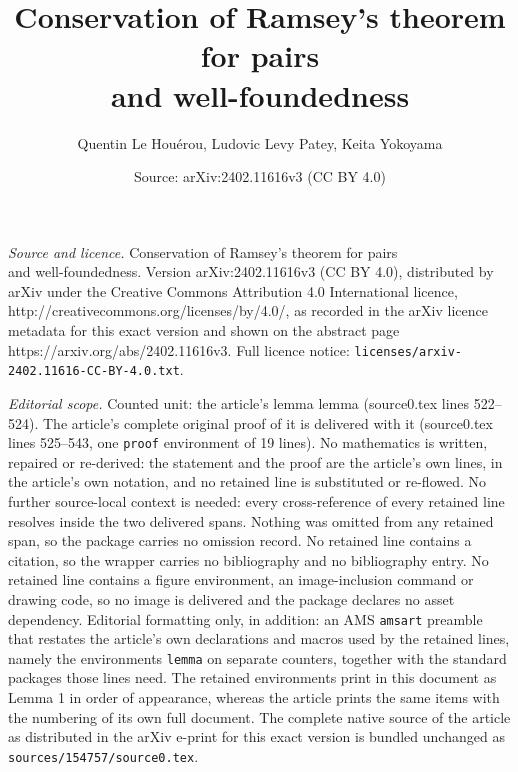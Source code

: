 \documentclass[10pt,a4paper]{amsart}
\title{Conservation of Ramsey's theorem for pairs\\ and well-foundedness}
\author{Quentin Le Hou\'erou, Ludovic Levy Patey, Keita Yokoyama}
\date{Source: arXiv:2402.11616v3 (CC BY 4.0)}
\newtheorem{lemma}{Lemma}
\begin{document}
\maketitle

\noindent\emph{Source and licence.} Conservation of Ramsey's theorem for pairs\\ and well-foundedness. Version arXiv:2402.11616v3 (CC BY 4.0), distributed by arXiv under the Creative Commons Attribution 4.0 International licence, http://creativecommons.org/licenses/by/4.0/, as recorded in the arXiv licence metadata for this exact version and shown on the abstract page https://arxiv.org/abs/2402.11616v3. Full licence notice: \texttt{licenses/arxiv-2402.11616-CC-BY-4.0.txt}.\par\smallskip

\noindent\textit{Editorial scope.} Counted unit: the article's lemma lemma (source0.tex lines 522--524). The article's complete original proof of it is delivered with it (source0.tex lines 525--543, one \texttt{proof} environment of 19 lines). No mathematics is written, repaired or re-derived: the statement and the proof are the article's own lines, in the article's own notation, and no retained line is substituted or re-flowed.  No further source-local context is needed: every cross-reference of every retained line resolves inside the two delivered spans.  Nothing was omitted from any retained span, so the package carries no omission record.  No retained line contains a citation, so the wrapper carries no bibliography and no bibliography entry.  No retained line contains a figure environment, an image-inclusion command or drawing code, so no image is delivered and the package declares no asset dependency.  Editorial formatting only, in addition: an AMS \texttt{amsart} preamble that restates the article's own declarations and macros used by the retained lines, namely the environments \texttt{lemma} on separate counters, together with the standard packages those lines need.  The retained environments print in this document as Lemma 1 in order of appearance, whereas the article prints the same items with the numbering of its own full document.  The complete native source of the article as distributed in the arXiv e-print for this exact version is bundled unchanged as \texttt{sources/154757/source0.tex}.
\end{document}

